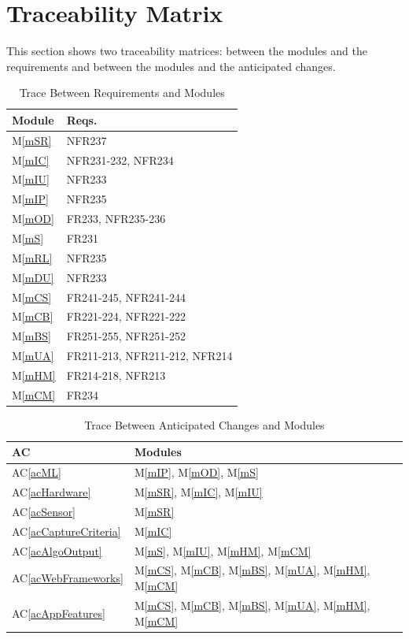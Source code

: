\documentclass[12pt, titlepage]{article}
\newcommand{\acref}[1]{AC\ref{#1}}
\newcommand{\mref}[1]{M\ref{#1}}
\begin{document}
\section{Traceability Matrix} \label{SecTM}

This section shows two traceability matrices: between the modules and the
requirements and between the modules and the anticipated changes.

\begin{table}[H]
\centering
\begin{tabular}{p{} p{}}
\toprule
\textbf{Module} & \textbf{Reqs.}\\
\midrule
\mref{mSR} & NFR237\\
\mref{mIC} & NFR231-232, NFR234\\
\mref{mIU} & NFR233\\
\mref{mIP} & NFR235\\
\mref{mOD} & FR233, NFR235-236\\
\mref{mS} & FR231\\
\mref{mRL} & NFR235\\
\mref{mDU} & NFR233\\
\mref{mCS} & FR241-245, NFR241-244\\
\mref{mCB} & FR221-224, NFR221-222\\
\mref{mBS} & FR251-255, NFR251-252\\
\mref{mUA} & FR211-213, NFR211-212, NFR214 \\
\mref{mHM} & FR214-218, NFR213 \\
\mref{mCM} & FR234 \\

\bottomrule
\end{tabular}
\caption{Trace Between Requirements and Modules}
\label{TblRT}
\end{table}

\begin{table}[H]
\centering
\begin{tabular}{p{} p{}}
\toprule
\textbf{AC} & \textbf{Modules}\\
\midrule
\acref{acML} & \mref{mIP}, \mref{mOD}, \mref{mS} \\
\acref{acHardware} & \mref{mSR}, \mref{mIC}, \mref{mIU} \\
\acref{acSensor} & \mref{mSR} \\
\acref{acCaptureCriteria} & \mref{mIC} \\
\acref{acAlgoOutput} & \mref{mS}, \mref{mIU}, \mref{mHM}, \mref{mCM} \\
\acref{acWebFrameworks} & \mref{mCS}, \mref{mCB}, \mref{mBS}, \mref{mUA}, \mref{mHM}, \mref{mCM} \\
\acref{acAppFeatures} & \mref{mCS}, \mref{mCB}, \mref{mBS}, \mref{mUA}, \mref{mHM}, \mref{mCM} \\

\bottomrule
\end{tabular}
\caption{Trace Between Anticipated Changes and Modules}
\label{TblACT}
\end{table}
\end{document}
